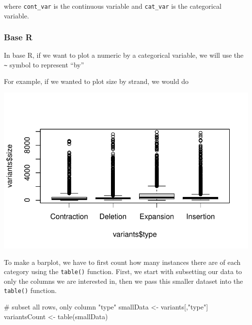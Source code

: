 \documentclass[
  letterpaper,
  DIV=11,
  numbers=noendperiod]{scrreprt}
\newenvironment{Shaded}{\begin{snugshade}}{\end{snugshade}}
\newcommand{\CommentTok}[1]{\textcolor[rgb]{0.37,0.37,0.37}{#1}}
\newcommand{\FunctionTok}[1]{\textcolor[rgb]{0.28,0.35,0.67}{#1}}
\newcommand{\NormalTok}[1]{\textcolor[rgb]{0.00,0.23,0.31}{#1}}
\newcommand{\OtherTok}[1]{\textcolor[rgb]{0.00,0.23,0.31}{#1}}
\newcommand{\SpecialCharTok}[1]{\textcolor[rgb]{0.37,0.37,0.37}{#1}}
\newcommand{\StringTok}[1]{\textcolor[rgb]{0.13,0.47,0.30}{#1}}
\begin{document}
where \texttt{cont\_var} is the continuous variable and
\texttt{cat\_var} is the categorical variable.

\subsubsection{Base R}\label{base-r-2}

In base R, if we want to plot a numeric by a categorical variable, we
will use the \texttt{\textasciitilde{}} symbol to represent ``by''

For example, if we wanted to plot size by strand, we would do

\begin{Shaded}
\end{Shaded}

\includegraphics{scripts/02_dataViz/class3_files/figure-pdf/unnamed-chunk-16-1.pdf}

To make a barplot, we have to first count how many instances there are
of each category using the \texttt{table()} function. First, we start
with subsetting our data to only the columns we are interested in, then
we pass this smaller dataset into the \texttt{table()} function.

\begin{Shaded}
\begin{Highlighting}[]
\CommentTok{\# subset all rows, only column "type"}
\NormalTok{smallData }\OtherTok{\textless{}{-}}\NormalTok{ variants[,}\StringTok{"type"}\NormalTok{]}
\NormalTok{variantsCount }\OtherTok{\textless{}{-}} \FunctionTok{table}\NormalTok{(smallData)}
\end{Highlighting}
\end{Shaded}
\end{document}
